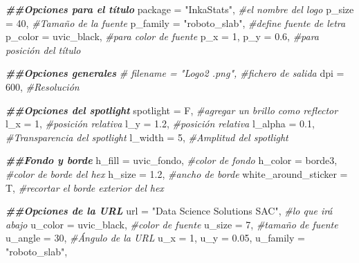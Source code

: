 \documentclass[
]{article}
\newenvironment{Shaded}{\begin{snugshade}}{\end{snugshade}}
\newcommand{\AttributeTok}[1]{\textcolor[rgb]{0.77,0.63,0.00}{#1}}
\newcommand{\CommentTok}[1]{\textcolor[rgb]{0.56,0.35,0.01}{\textit{#1}}}
\newcommand{\DecValTok}[1]{\textcolor[rgb]{0.00,0.00,0.81}{#1}}
\newcommand{\DocumentationTok}[1]{\textcolor[rgb]{0.56,0.35,0.01}{\textbf{\textit{#1}}}}
\newcommand{\FloatTok}[1]{\textcolor[rgb]{0.00,0.00,0.81}{#1}}
\newcommand{\NormalTok}[1]{#1}
\newcommand{\StringTok}[1]{\textcolor[rgb]{0.31,0.60,0.02}{#1}}
\begin{document}
\begin{Shaded}
\begin{Highlighting}[]
    \DocumentationTok{\#\#Opciones para el título}
    \AttributeTok{package              =} \StringTok{"InkaStats"}\NormalTok{, }\CommentTok{\#el nombre del logo}
    \AttributeTok{p\_size               =} \DecValTok{40}\NormalTok{, }\CommentTok{\#Tamaño de la fuente}
    \AttributeTok{p\_family             =} \StringTok{"roboto\_slab"}\NormalTok{, }\CommentTok{\#define fuente de letra}
    \AttributeTok{p\_color              =}\NormalTok{ uvic\_black, }\CommentTok{\#para color de fuente}
    \AttributeTok{p\_x                  =} \DecValTok{1}\NormalTok{, }\AttributeTok{p\_y =} \FloatTok{0.6}\NormalTok{, }\CommentTok{\#para posición del título}
    
    \DocumentationTok{\#\#Opciones generales}
    \CommentTok{\# filename           = "Logo2 .png", \#fichero de salida}
    \AttributeTok{dpi                  =} \DecValTok{600}\NormalTok{, }\CommentTok{\#Resolución}
    
    \DocumentationTok{\#\#Opciones del spotlight}
    \AttributeTok{spotlight            =}\NormalTok{ F, }\CommentTok{\#agregar un brillo como reflector }
    \AttributeTok{l\_x                  =} \DecValTok{1}\NormalTok{, }\CommentTok{\#posición relativa}
    \AttributeTok{l\_y                  =} \FloatTok{1.2}\NormalTok{, }\CommentTok{\#posición relativa}
    \AttributeTok{l\_alpha              =} \FloatTok{0.1}\NormalTok{, }\CommentTok{\#Transparencia del spotlight}
    \AttributeTok{l\_width              =} \DecValTok{5}\NormalTok{, }\CommentTok{\#Amplitud del spotlight}
    
    \DocumentationTok{\#\#Fondo y borde}
    \AttributeTok{h\_fill               =}\NormalTok{ uvic\_fondo, }\CommentTok{\#color de fondo}
    \AttributeTok{h\_color              =}\NormalTok{ borde3, }\CommentTok{\#color de borde del hex}
    \AttributeTok{h\_size               =} \FloatTok{1.2}\NormalTok{, }\CommentTok{\#ancho de borde}
    \AttributeTok{white\_around\_sticker =}\NormalTok{ T, }\CommentTok{\#recortar el borde exterior del hex}
    
    \DocumentationTok{\#\#Opciones de la URL}
    \AttributeTok{url                  =} \StringTok{"Data Science Solutions SAC"}\NormalTok{, }\CommentTok{\#lo que irá abajo          }
    \AttributeTok{u\_color              =}\NormalTok{ uvic\_black, }\CommentTok{\#color de fuente}
    \AttributeTok{u\_size               =} \DecValTok{7}\NormalTok{, }\CommentTok{\#tamaño de fuente}
    \AttributeTok{u\_angle              =} \DecValTok{30}\NormalTok{, }\CommentTok{\#Ángulo de la URL}
    \AttributeTok{u\_x                  =} \DecValTok{1}\NormalTok{, }
    \AttributeTok{u\_y                  =} \FloatTok{0.05}\NormalTok{, }
    \AttributeTok{u\_family             =} \StringTok{"roboto\_slab"}\NormalTok{, }
    

\end{Highlighting}
\end{Shaded}
\end{document}
